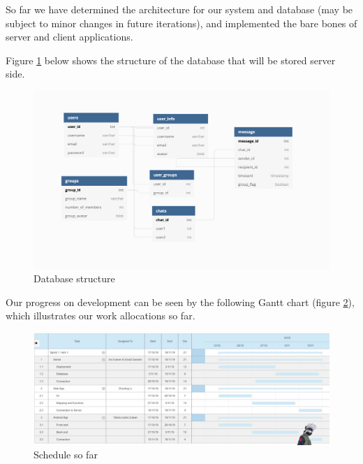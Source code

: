 So far we have determined the architecture for our system and database (may be subject to minor changes in future iterations), and implemented the bare bones of server and client applications. 

Figure \ref{dbfig} below shows the structure of the database that will be stored server side.

\begin{figure}[h]
\includegraphics[width=\linewidth]{db.png}
\caption{Database structure}
\label{dbfig}
\end{figure}

Our progress on development can be seen by the following Gantt chart (figure \ref{schedulefig}), which illustrates our work allocations so far.  


\begin{figure}[h]
\includegraphics[width=\linewidth]{gantt.jpeg}
\caption{Schedule so far}
\label{schedulefig}
\end{figure}
